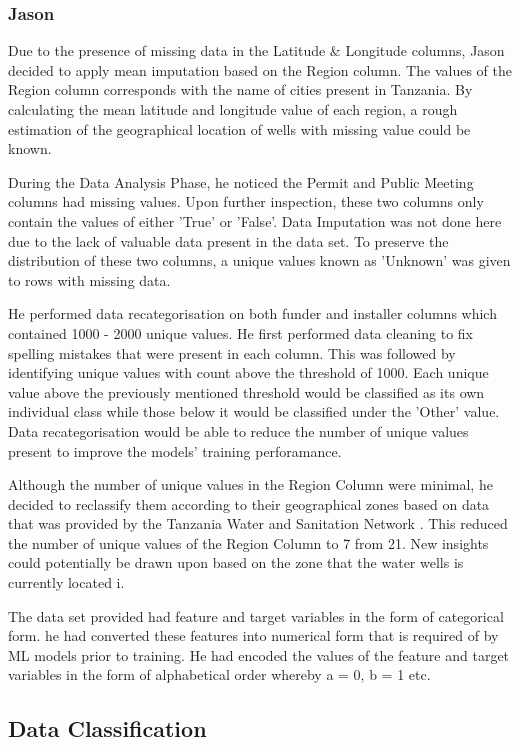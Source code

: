 \documentclass[conference]{IEEEtran}
\begin{document}
\subsubsection{Jason}

Due to the presence of missing data in the Latitude \& Longitude columns, Jason decided to apply mean imputation based on the Region column. The values of the Region column corresponds with the name of cities present in Tanzania. By calculating the  mean latitude and longitude value of each region, a rough estimation of the geographical location of wells with missing value could be known. 

During the Data Analysis Phase, he noticed the Permit and Public Meeting columns had missing values. Upon further inspection, these two columns only contain the values of either 'True' or 'False'. Data Imputation was not done here due to the lack of valuable data present in the data set. To preserve the distribution of these two columns, a unique values known as 'Unknown' was given to rows with missing data.

He performed data recategorisation on both funder and installer columns which contained 1000 - 2000 unique values. He first performed data cleaning to fix spelling mistakes that were present in each column. This was followed by identifying unique values with count above the threshold of 1000. Each unique value above the previously mentioned threshold would be classified as its own individual class while those below it would be classified under the 'Other' value. Data recategorisation would be able to reduce the number of unique values present to improve the models' training perforamance.

Although the number of unique values in the Region Column were minimal, he decided to reclassify them according to their geographical zones based on data that was provided by the Tanzania Water and Sanitation Network \cite{tawasanet}. This reduced the number of unique values of the Region Column to 7 from 21. New insights could potentially be drawn upon  based on the zone that the water wells is currently located i.

The data set provided had feature and target variables in the form of categorical form. he had converted these features into numerical form that is required of by ML models prior to training. He had encoded the values of the feature and target variables in the form of alphabetical order whereby a = 0, b = 1 etc. 

\subsection{Data Classification}
\end{document}

